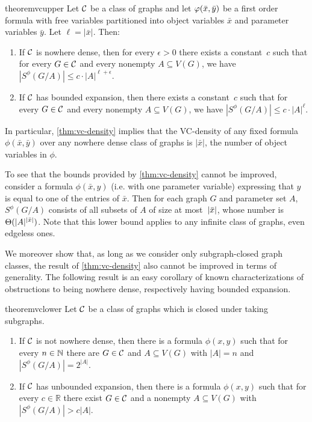 \begin{restatable}{theorem}{vcupper}\label{thm:vc-density}
Let $\mathcal{C}$ be a class of graphs and let $\varphi(\bar{x},\bar{y})$ be a first order formula
with free variables  partitioned  into object variables $\bar x$  and parameter variables $\bar y$. Let $\ell=|\bar x|$. Then:
\begin{enumerate}[(1)]
\item If $\mathcal{C}$ is nowhere dense, then for every $\epsilon>0$ 
there exists a constant~$c$ such that for every $G\in \mathcal{C}$ and every nonempty
$A\subseteq V(G)$, we have $|S^\phi(G/A)|\leq c\cdot |A|^{\ell+\epsilon}.$
\item If $\mathcal{C}$ has bounded expansion, then there exists a constant~$c$ such that for every $G\in \mathcal{C}$ and every nonempty $A\subseteq V(G)$, we have $|S^\phi(G/A)|\leq c\cdot |A|^\ell$.
\end{enumerate}
\end{restatable}

In particular, \cref{thm:vc-density} implies that
the VC-density of any fixed formula 
$\phi(\bar x,\bar y)$ over any nowhere dense class of graphs is $|\bar x|$, the number of object variables in $\phi$.

To see that the bounds provided by \cref{thm:vc-density} cannot be improved, consider a formula $\phi(\bar x,y)$ (i.e. with one parameter variable) expressing that $y$ is equal to one of the entries of 
$\bar x$. Then for each graph $G$ and parameter set $A$, $S^{\phi}(G/A)$ consists of all subsets of $A$ of size at most~$|\bar{x}|$, whose number is $\Theta(|A|^{|\bar{x}|})$. Note that
this lower bound applies to any infinite class of graphs, even edgeless ones.

We moreover show that, as long as we consider only subgraph-closed graph classes, the result of \cref{thm:vc-density} also cannot be improved in terms of generality.
The following result is an easy corollary of known characterizations of obstructions to being nowhere dense, respectively having bounded expansion.

  \begin{restatable}{theorem}{vclower}\label{thm:vc-density-lower-bound}
  Let $\mathcal{C}$ be a class of graphs which 
  is closed under taking subgraphs. 
  \begin{enumerate}[(1)]
  \item If $\mathcal{C}$ is not nowhere dense, then there is a formula 
  $\phi(x,y)$ such that for every $n\in \mathbb{N}$ there are $G\in\mathcal{C}$ and $A\subseteq V(G)$ 
  with $|A|=n$ and $|S^\phi(G/A)|=2^{|A|}$. 
  \item If $\mathcal{C}$ has unbounded expansion, then there is a formula 
  $\phi(x,y)$ such that for every $c\in \mathbb{R}$ there exist $G\in\mathcal{C}$ and a nonempty $A\subseteq V(G)$ with $|S^\phi(G/A)|>c|A|$. 
  \end{enumerate}
  \end{restatable}  


